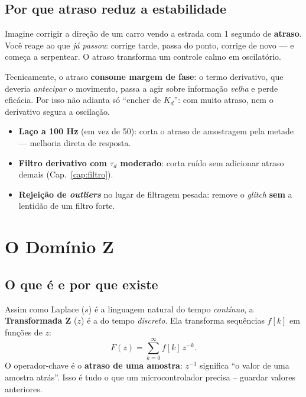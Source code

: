 \section{Por que atraso reduz a estabilidade}
\begin{intuicao}
Imagine corrigir a dire\c{c}\~ao de um carro vendo a estrada com 1 segundo de
\textbf{atraso}. Voc\^e reage ao que \emph{j\'a passou}: corrige tarde, passa do
ponto, corrige de novo --- e come\c{c}a a serpentear. O atraso transforma um
controle calmo em oscilat\'orio.
\end{intuicao}

Tecnicamente, o atraso \textbf{consome margem de fase}: o termo derivativo, que
deveria \emph{antecipar} o movimento, passa a agir sobre informa\c{c}\~ao
\emph{velha} e perde efic\'acia. Por isso n\~ao adianta s\'o ``encher de $K_d$'':
com muito atraso, nem o derivativo segura a oscila\c{c}\~ao.

\begin{projeto}
\begin{itemize}[leftmargin=1.4em]
  \item \textbf{La\c{c}o a 100 Hz} (em vez de 50): corta o atraso de amostragem pela
  metade --- melhoria direta de resposta.
  \item \textbf{Filtro derivativo com $\tau_d$ moderado}: corta ru\'ido sem
  adicionar atraso demais (Cap.~\ref{cap:filtro}).
  \item \textbf{Rejei\c{c}\~ao de \emph{outliers}} no lugar de filtragem pesada:
  remove o \emph{glitch} \textbf{sem} a lentid\~ao de um filtro forte.
\end{itemize}
\end{projeto}

\chapter{O Dom\'inio Z}\label{cap:z}

\section{O que \'e e por que existe}
Assim como Laplace ($s$) \'e a linguagem natural do tempo \emph{cont\'inuo}, a
\textbf{Transformada Z} ($z$) \'e a do tempo \emph{discreto}. Ela transforma
sequ\^encias $f[k]$ em fun\c{c}\~oes de $z$:
\begin{equation}
F(z)=\sum_{k=0}^{\infty} f[k]\,z^{-k}.
\end{equation}
O operador-chave \'e o \textbf{atraso de uma amostra}: $z^{-1}$ significa ``o valor
de uma amostra atr\'as''. Isso \'e tudo o que um microcontrolador precisa --
guardar valores anteriores.

